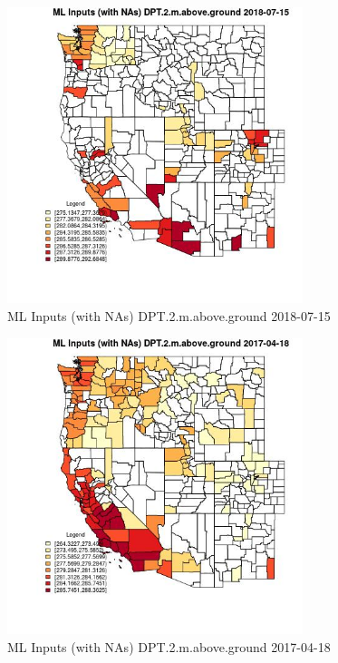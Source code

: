 \begin{figure} 
\centering  
\includegraphics[width=0.77\textwidth]{Code_Outputs/Report_ML_input_PM25_Step4_part_e_de_duplicated_aves_compiled_2019-05-21wNAs_CountyDPT2mabovegroundMean2018-07-15.jpg} 
\caption{\label{fig:Report_ML_input_PM25_Step4_part_e_de_duplicated_aves_compiled_2019-05-21wNAsCountyDPT2mabovegroundMean2018-07-15}ML Inputs (with NAs) DPT.2.m.above.ground 2018-07-15} 
\end{figure} 
 

\begin{figure} 
\centering  
\includegraphics[width=0.77\textwidth]{Code_Outputs/Report_ML_input_PM25_Step4_part_e_de_duplicated_aves_compiled_2019-05-21wNAs_CountyDPT2mabovegroundMean2017-04-18.jpg} 
\caption{\label{fig:Report_ML_input_PM25_Step4_part_e_de_duplicated_aves_compiled_2019-05-21wNAsCountyDPT2mabovegroundMean2017-04-18}ML Inputs (with NAs) DPT.2.m.above.ground 2017-04-18} 
\end{figure} 
 

